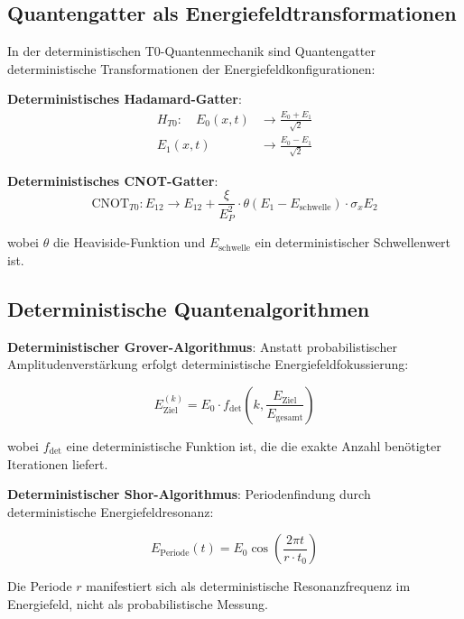 \documentclass[12pt,a4paper]{article}
\newcommand{\xipar}{\xi}
\newcommand{\EPlanck}{E_P}
\theoremstyle{definition}
\theoremstyle{remark}
\begin{document}
\subsection{Quantengatter als Energiefeldtransformationen}

In der deterministischen T0-Quantenmechanik sind Quantengatter deterministische Transformationen der Energiefeldkonfigurationen:

\textbf{Deterministisches Hadamard-Gatter}:
\begin{align}
	H_{T0}: \quad E_0(x,t) &\rightarrow \frac{E_0 + E_1}{\sqrt{2}} \\
	E_1(x,t) &\rightarrow \frac{E_0 - E_1}{\sqrt{2}}
\end{align}

\textbf{Deterministisches CNOT-Gatter}:
\begin{equation}
	\text{CNOT}_{T0}: E_{12} \rightarrow E_{12} + \frac{\xipar}{\EPlanck^2} \cdot \theta(E_1 - E_{\text{schwelle}}) \cdot \sigma_x E_2
\end{equation}

wobei $\theta$ die Heaviside-Funktion und $E_{\text{schwelle}}$ ein deterministischer Schwellenwert ist.

\subsection{Deterministische Quantenalgorithmen}

\textbf{Deterministischer Grover-Algorithmus}:
Anstatt probabilistischer Amplitudenverst{\"a}rkung erfolgt deterministische Energiefeldfokussierung:

\begin{equation}
	E_{\text{Ziel}}^{(k)} = E_0 \cdot f_{\text{det}}\left(k, \frac{E_{\text{Ziel}}}{E_{\text{gesamt}}}\right)
\end{equation}

wobei $f_{\text{det}}$ eine deterministische Funktion ist, die die exakte Anzahl ben{\"o}tigter Iterationen liefert.

\textbf{Deterministischer Shor-Algorithmus}:
Periodenfindung durch deterministische Energiefeldresonanz:

\begin{equation}
	E_{\text{Periode}}(t) = E_0 \cos\left(\frac{2\pi t}{r \cdot t_0}\right)
\end{equation}

Die Periode $r$ manifestiert sich als deterministische Resonanzfrequenz im Energiefeld, nicht als probabilistische Messung.
\end{document}
